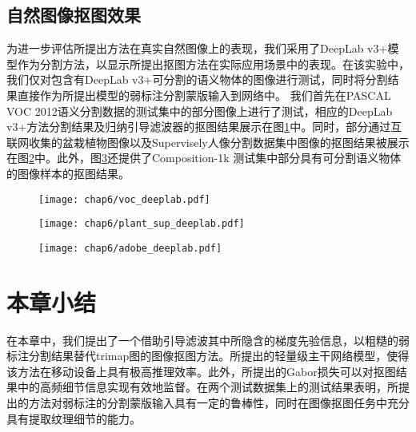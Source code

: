 \subsection{自然图像抠图效果}
为进一步评估所提出方法在真实自然图像上的表现，我们采用了DeepLab v3+\cite{chen2018encoder}模型作为分割方法，以显示所提出抠图方法在实际应用场景中的表现。在该实验中，我们仅对包含有DeepLab v3+可分割的语义物体的图像进行测试，同时将分割结果直接作为所提出模型的弱标注分割蒙版输入到网络中。
我们首先在PASCAL VOC 2012\cite{everingham2015pascal}语义分割数据的测试集中的部分图像上进行了测试，相应的DeepLab v3+方法分割结果及归纳引导滤波器的抠图结果展示在图\ref{fig6:voc_deeplab}中。同时，部分通过互联网收集的盆栽植物图像以及Supervisely人像分割数据集\cite{Supervise.ly}中图像的抠图结果被展示在图\ref{fig6:plant_sup_deeplab}中。此外，图\ref{fig6:adobe_deeplab}还提供了Composition-1k 测试集\cite{xu2017deep}中部分具有可分割语义物体的图像样本的抠图结果。
\begin{figure}[h]
	\centering
	\texttt{[image: chap6/voc\_deeplab.pdf]}
	\label{fig6:voc_deeplab}
\end{figure}
\begin{figure}[h]
	\centering
	\texttt{[image: chap6/plant\_sup\_deeplab.pdf]}
	\label{fig6:plant_sup_deeplab}
\end{figure}
\begin{figure}[h]
	\centering
	\texttt{[image: chap6/adobe\_deeplab.pdf]}
	\label{fig6:adobe_deeplab}
\end{figure}
\section{本章小结}
在本章中，我们提出了一个借助引导滤波其中所隐含的梯度先验信息，以粗糙的弱标注分割结果替代trimap图的图像抠图方法。所提出的轻量级主干网络模型，使得该方法在移动设备上具有极高推理效率。此外，所提出的Gabor损失可以对抠图结果中的高频细节信息实现有效地监督。在两个测试数据集上的测试结果表明，所提出的方法对弱标注的分割蒙版输入具有一定的鲁棒性，同时在图像抠图任务中充分具有提取纹理细节的能力。
